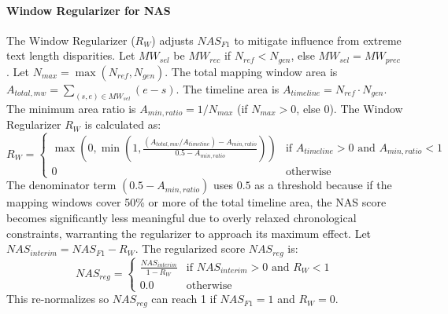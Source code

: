 \documentclass[letterpaper]{article} %
\begin{document}
\paragraph{Window Regularizer for NAS}
\label{sssec:window_regularizer_revised}
The Window Regularizer ($R_W$) adjusts $NAS_{F1}$ to mitigate influence from extreme text length disparities.
Let $MW_{sel}$ be $MW_{rec}$ if $N_{ref} < N_{gen}$, else $MW_{sel} = MW_{prec}$.
Let $N_{max} = \max(N_{ref}, N_{gen})$.
The total mapping window area is $A_{total,mw} = \sum_{(s,e) \in MW_{sel}} (e-s)$.
The timeline area is $A_{timeline} = N_{ref} \cdot N_{gen}$.
The minimum area ratio is $A_{min,ratio} = 1/N_{max}$ (if $N_{max}>0$, else 0).
The Window Regularizer $R_W$ is calculated as:
\begin{equation}
R_W = 
\begin{cases}
\max\left(0, \min\left(1, \frac{(A_{total,mw} / A_{timeline}) - A_{min,ratio}}{0.5 - A_{min,ratio}}\right)\right) & \text{if } A_{timeline} > 0 \text{ and } A_{min,ratio} < 1 \\
0 & \text{otherwise}
\end{cases}
\end{equation}
The denominator term $(0.5 - A_{min,ratio})$ uses $0.5$ as a threshold because if the mapping windows cover 50\% or more of the total timeline area, the NAS score becomes significantly less meaningful due to overly relaxed chronological constraints, warranting the regularizer to approach its maximum effect.
Let $NAS_{interim} = NAS_{F1} - R_W$. The regularized score $NAS_{reg}$ is:
\begin{equation}
\label{eq:nas_reg_revised}
NAS_{reg} =
\begin{cases}
\frac{NAS_{interim}}{1 - R_W} & \text{if } NAS_{interim} > 0 \text{ and } R_W < 1 \\
0.0 & \text{otherwise}
\end{cases}
\end{equation}
This re-normalizes so $NAS_{reg}$ can reach 1 if $NAS_{F1}=1$ and $R_W=0$.
\end{document}
